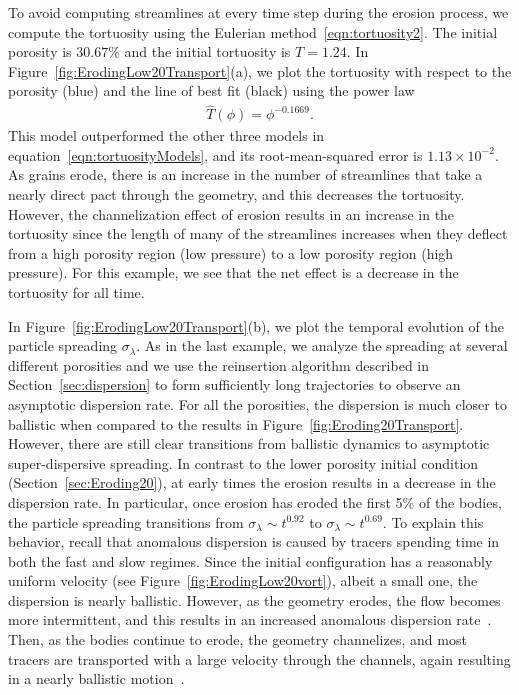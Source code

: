 \documentclass[preprint,10pt]{elsarticle}
\begin{document}
To avoid computing streamlines at every time step during the erosion
process, we compute the tortuosity using the Eulerian
method~\eqref{eqn:tortuosity2}.  The initial porosity is $30.67\%$ and
the initial tortuosity is $T = 1.24$.  In
Figure~\ref{fig:ErodingLow20Transport}(a), we plot the tortuosity with
respect to the porosity (blue) and the line of best fit (black) using
the power law 
\begin{align}
  \widehat{T}(\phi) = \phi^{-0.1669}.
\end{align}
This model outperformed the other three models in
equation~\eqref{eqn:tortuosityModels}, and its root-mean-squared error
is $1.13 \times 10^{-2}$.  As grains erode, there is an increase in the
number of streamlines that take a nearly direct pact through the
geometry, and this decreases the tortuosity. However, the channelization
effect of erosion results in an increase in the tortuosity since the
length of many of the streamlines increases when they deflect from a
high porosity region (low pressure) to a low porosity region (high
pressure). For this example, we see that the net effect is a decrease in
the tortuosity for all time.

In Figure~\ref{fig:ErodingLow20Transport}(b), we plot the temporal
evolution of the particle spreading $\sigma_\lambda$.  As in the last
example, we analyze the spreading at several different porosities and we
use the reinsertion algorithm described in Section~\ref{sec:dispersion}
to form sufficiently long trajectories to observe an asymptotic
dispersion rate.  For all the porosities, the dispersion is much closer
to ballistic when compared to the results in
Figure~\ref{fig:Eroding20Transport}.  However, there are still clear
transitions from ballistic dynamics to asymptotic super-dispersive
spreading.  In contrast to the lower porosity initial condition
(Section~\ref{sec:Eroding20}), at early times the erosion results in a
decrease in the dispersion rate. In particular, once erosion has eroded
the first 5\% of the bodies, the particle spreading transitions from
$\sigma_\lambda \sim t^{0.92}$ to $\sigma_\lambda \sim t^{0.69}$.  To
explain this behavior, recall that anomalous dispersion is caused by
tracers spending time in both the fast and slow regimes.  Since the
initial configuration has a reasonably uniform velocity (see
Figure~\ref{fig:ErodingLow20vort}), albeit a small one, the dispersion
is nearly ballistic. However, as the geometry erodes, the flow becomes
more intermittent, and this results in an increased anomalous dispersion
rate~\cite{dea-leb-den-tar-bol-dav2013}.  Then, as the bodies continue
to erode, the geometry channelizes, and most tracers are transported
with a large velocity through the channels, again resulting in a nearly
ballistic motion~\cite{sie-ili-pri-riv-gua2019}.
\end{document}
